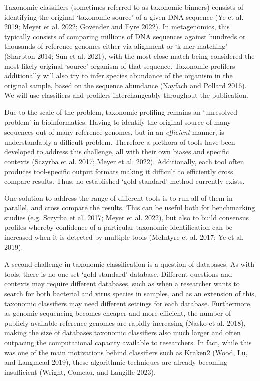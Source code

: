 \documentclass[
]{article}
\begin{document}
Taxonomic classifiers (sometimes referred to as taxonomic binners)
consists of identifying the original `taxonomic source' of a given DNA
sequence (Ye et al. 2019; Meyer et al. 2022; Govender and Eyre 2022). In
metagenomics, this typically consists of comparing millions of DNA
sequences against hundreds or thousands of reference genomes either via
alignment or `k-mer matching' (Sharpton 2014; Sun et al. 2021), with the
most close match being considered the most likely original `source'
organism of that sequence. Taxonomic profilers additionally will also
try to infer species abundance of the organism in the original sample,
based on the sequence abundance (Nayfach and Pollard 2016). We will use
classifiers and profilers interchangeably throughout the publication.

Due to the scale of the problem, taxonomic profiling remains an
`unresolved problem' in bioinformatics. Having to identify the original
source of many sequences out of many reference genomes, but in an
\emph{efficient} manner, is understandably a difficult problem.
Therefore a plethora of tools have been developed to address this
challenge, all with their own biases and specific contexts (Sczyrba et
al. 2017; Meyer et al. 2022). Additionally, each tool often produces
tool-specific output formats making it difficult to efficiently cross
compare results. Thus, no established `gold standard' method currently
exists.

One solution to address the range of different tools is to run all of
them in parallel, and cross compare the results. This can be useful both
for benchmarking studies (e.g. Sczyrba et al. 2017; Meyer et al. 2022),
but also to build consensus profiles whereby confidence of a particular
taxonomic identification can be increased when it is detected by
multiple tools (McIntyre et al. 2017; Ye et al. 2019).

A second challenge in taxonomic classification is a question of
databases. As with tools, there is no one set `gold standard' database.
Different questions and contexts may require different databases, such
as when a researcher wants to search for both bacterial and virus
species in samples, and as an extension of this, taxonomic classifiers
may need different settings for each database. Furthermore, as genomic
sequencing becomes cheaper and more efficient, the number of publicly
available reference genomes are rapidly increasing (Nasko et al. 2018),
making the size of databases taxonomic classifiers also much larger and
often outpacing the computational capacity available to researchers. In
fact, while this was one of the main motivations behind classifiers such
as Kraken2 (Wood, Lu, and Langmead 2019), these algorithmic techniques
are already becoming insufficient (Wright, Comeau, and Langille 2023).
\end{document}
